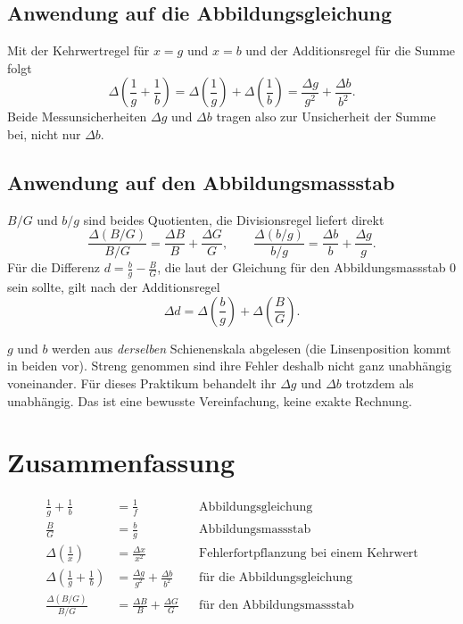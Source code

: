 \documentclass[11pt,a4paper]{article}
\begin{document}
\subsection{Anwendung auf die Abbildungsgleichung}

Mit der Kehrwertregel für $x=g$ und $x=b$ und der Additionsregel für die Summe folgt
\[
  \boxed{\Delta\!\left(\frac1g+\frac1b\right) = \Delta\!\left(\frac1g\right)+\Delta\!\left(\frac1b\right) = \frac{\Delta g}{g^2}+\frac{\Delta b}{b^2}}.
\]
Beide Messunsicherheiten $\Delta g$ und $\Delta b$ tragen also zur Unsicherheit der Summe bei, nicht nur $\Delta b$.

\subsection{Anwendung auf den Abbildungsmassstab}

$B/G$ und $b/g$ sind beides Quotienten, die Divisionsregel liefert direkt
\[
  \boxed{\frac{\Delta(B/G)}{B/G} = \frac{\Delta B}{B}+\frac{\Delta G}{G}, \qquad \frac{\Delta(b/g)}{b/g} = \frac{\Delta b}{b}+\frac{\Delta g}{g}}.
\]
Für die Differenz $d=\tfrac bg-\tfrac BG$, die laut der Gleichung für den Abbildungsmassstab $0$ sein sollte, gilt nach der Additionsregel
\[
  \Delta d = \Delta\!\left(\frac bg\right)+\Delta\!\left(\frac BG\right).
\]

\begin{achtungbox}
$g$ und $b$ werden aus \emph{derselben} Schienenskala abgelesen (die Linsenposition kommt in beiden vor). Streng genommen sind ihre Fehler deshalb nicht ganz unabhängig voneinander. Für dieses Praktikum behandelt ihr $\Delta g$ und $\Delta b$ trotzdem als unabhängig. Das ist eine bewusste Vereinfachung, keine exakte Rechnung.
\end{achtungbox}

\section{Zusammenfassung}
\begin{tippbox}
\begin{align*}
  \frac{1}{g} + \frac{1}{b} &= \frac{1}{f} &&\text{Abbildungsgleichung} \\
  \frac{B}{G} &= \frac{b}{g} &&\text{Abbildungsmassstab} \\
  \Delta\!\left(\frac{1}{x}\right) &= \frac{\Delta x}{x^2} &&\text{Fehlerfortpflanzung bei einem Kehrwert} \\
  \Delta\!\left(\frac1g+\frac1b\right) &= \frac{\Delta g}{g^2}+\frac{\Delta b}{b^2} &&\text{für die Abbildungsgleichung} \\
  \frac{\Delta(B/G)}{B/G} &= \frac{\Delta B}{B}+\frac{\Delta G}{G} &&\text{für den Abbildungsmassstab}
\end{align*}
\end{tippbox}
\end{document}
